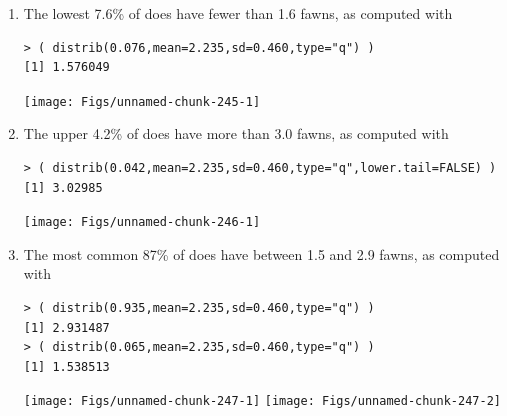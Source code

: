 \documentclass[10pt,openany]{book}\usepackage[]{graphicx}\usepackage[]{color}
\makeatletter
\newenvironment{kframe}{%
 \def\at@end@of@kframe{}%
 \ifinner\ifhmode%
  \def\at@end@of@kframe{\end{minipage}}%
  \begin{minipage}{\columnwidth}%
 \fi\fi%
 \def\FrameCommand##1{\hskip\@totalleftmargin \hskip-\fboxsep
 \colorbox{shadecolor}{##1}\hskip-\fboxsep
     \hskip-\linewidth \hskip-\@totalleftmargin \hskip\columnwidth}%
 \MakeFramed {\advance\hsize-\width
   \@totalleftmargin\z@ \linewidth\hsize
   \@setminipage}}%
 {\par\unskip\endMakeFramed%
 \at@end@of@kframe}
\newenvironment{knitrout}{}{} %
\makeatother
\begin{document}
\begin{itemize}
\begin{enumerate}
\begin{knitrout}
{}



\end{knitrout}
      \item The lowest 7.6\% of does have fewer than 1.6 fawns, as computed with
\begin{knitrout}
\color{fgcolor}\begin{kframe}
\begin{verbatim}
> ( distrib(0.076,mean=2.235,sd=0.460,type="q") )
[1] 1.576049
\end{verbatim}
\end{kframe}

{\centering \texttt{[image: Figs/unnamed-chunk-245-1]} 

}



\end{knitrout}
      \item The upper 4.2\% of does have more than 3.0 fawns, as computed with
\begin{knitrout}
\color{fgcolor}\begin{kframe}
\begin{verbatim}
> ( distrib(0.042,mean=2.235,sd=0.460,type="q",lower.tail=FALSE) )
[1] 3.02985
\end{verbatim}
\end{kframe}

{\centering \texttt{[image: Figs/unnamed-chunk-246-1]} 

}



\end{knitrout}
      \item The most common 87\% of does have between 1.5 and 2.9 fawns, as computed with
\begin{knitrout}
\color{fgcolor}\begin{kframe}
\begin{verbatim}
> ( distrib(0.935,mean=2.235,sd=0.460,type="q") )
[1] 2.931487
> ( distrib(0.065,mean=2.235,sd=0.460,type="q") )
[1] 1.538513
\end{verbatim}
\end{kframe}

{\centering \texttt{[image: Figs/unnamed-chunk-247-1]} 
\texttt{[image: Figs/unnamed-chunk-247-2]} 

}




\end{knitrout}
\end{enumerate}
\end{itemize}
\end{document}
